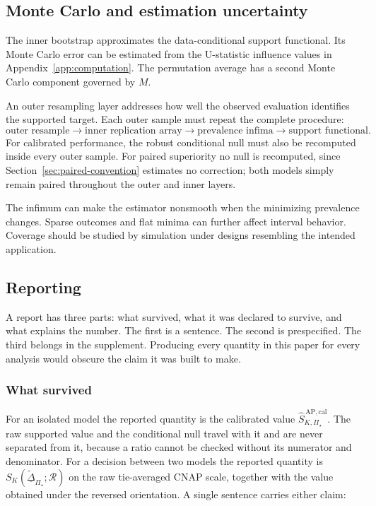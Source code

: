 \documentclass[11pt]{article}
\newcommand{\Regime}{\mathcal{R}}
\newcommand{\PSet}{\Pi_\star}
\newcommand{\SRobCalHat}{\widehat S_{K,\PSet}^{\,\mathrm{AP,cal}}}
\newcommand{\RobDta}{\underline{\widetilde{\Delta}}_{\PSet}}
\theoremstyle{remark}
\begin{document}
\subsection{Monte Carlo and estimation uncertainty}

The inner bootstrap approximates the data-conditional support functional. Its Monte Carlo error can be estimated from the U-statistic influence values in Appendix~\ref{app:computation}. The permutation average has a second Monte Carlo component governed by $M$.

An outer resampling layer addresses how well the observed evaluation identifies the supported target. Each outer sample must repeat the complete procedure:
\[
\text{outer resample}
\longrightarrow
\text{inner replication array}
\longrightarrow
\text{prevalence infima}
\longrightarrow
\text{support functional}.
\]
For calibrated performance, the robust conditional null must also be recomputed inside every outer sample. For paired superiority no null is recomputed, since Section~\ref{sec:paired-convention} estimates no correction; both models simply remain paired throughout the outer and inner layers.

The infimum can make the estimator nonsmooth when the minimizing prevalence changes. Sparse outcomes and flat minima can further affect interval behavior. Coverage should be studied by simulation under designs resembling the intended application.

\subsection{Reporting}

A report has three parts: what survived, what it was declared to survive, and what explains the number. The first is a sentence. The second is prespecified. The third belongs in the supplement. Producing every quantity in this paper for every analysis would obscure the claim it was built to make.

\subsubsection*{What survived}

For an isolated model the reported quantity is the calibrated value $\SRobCalHat$. The raw supported value and the conditional null travel with it and are never separated from it, because a ratio cannot be checked without its numerator and denominator. For a decision between two models the reported quantity is $S_K(\RobDta;\Regime)$ on the raw tie-averaged CNAP scale, together with the value obtained under the reversed orientation. A single sentence carries either claim:
\end{document}
